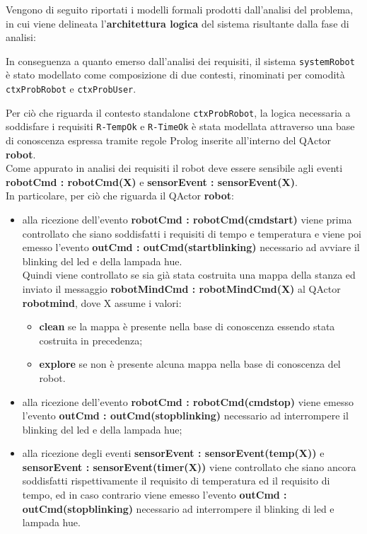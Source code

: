 \documentclass{llncs}
\newcommand{\action}[1]{\texttt{#1}\xspace}
\newcommand{\code}[1]{{\color{blue}\small{\texttt{#1}}}}
\begin{document}
Vengono di seguito riportati i modelli formali prodotti dall'analisi del problema, in cui viene delineata l'\textbf{architettura logica} del sistema risultante dalla fase di analisi: 




In conseguenza a quanto emerso dall'analisi dei requisiti, il sistema \action{systemRobot} è stato modellato come composizione di due contesti, rinominati per comodità \action{ctxProbRobot} e \action{ctxProbUser}. 

Per ciò che riguarda il contesto standalone \action{ctxProbRobot}, la logica necessaria a soddisfare i requisiti \code{R-TempOk} e \code{R-TimeOk} è stata modellata attraverso una base di conoscenza espressa tramite regole Prolog inserite all'interno del QActor \textbf{robot}. \\ Come appurato in analisi dei requisiti il robot deve essere sensibile agli eventi \textbf{robotCmd : robotCmd(X)} e \textbf{sensorEvent : sensorEvent(X)}. \\ In particolare, per ciò che riguarda il QActor \textbf{robot}: 
\begin{itemize}
	\item alla ricezione dell'evento \textbf{robotCmd : robotCmd(cmdstart)} viene prima controllato che siano soddisfatti i requisiti di tempo e temperatura e viene poi emesso l'evento \textbf{outCmd : outCmd(startblinking)} necessario ad avviare il blinking del led e della lampada hue. \\ Quindi viene controllato se sia già stata costruita una mappa della stanza ed inviato il messaggio \textbf{robotMindCmd : robotMindCmd(X)} al QActor \textbf{robotmind}, dove X assume i valori: 
	\begin{itemize}
		\item \textbf{clean} se la mappa è presente nella base di conoscenza essendo stata costruita in precedenza;
		\item \textbf{explore} se non è presente alcuna mappa nella base di conoscenza del robot.
	\end{itemize}
	\item alla ricezione dell'evento \textbf{robotCmd : robotCmd(cmdstop)} viene emesso l'evento \textbf{outCmd : outCmd(stopblinking)} necessario ad interrompere il blinking del led e della lampada hue;
	\item alla ricezione degli eventi \textbf{sensorEvent : sensorEvent(temp(X))} e \textbf{sensorEvent : sensorEvent(timer(X))} viene controllato che siano ancora soddisfatti rispettivamente il requisito di temperatura ed il requisito di tempo, ed in caso contrario viene emesso l'evento \textbf{outCmd : outCmd(stopblinking)} necessario ad interrompere il blinking di led e lampada hue.
\end{itemize}
\end{document}
